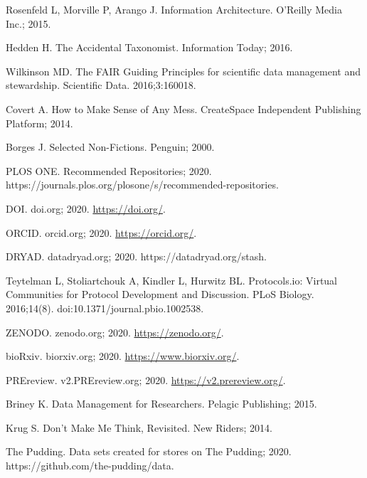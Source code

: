 \documentclass[10pt,letterpaper]{article}
\begin{document}
% 
\begin{thebibliography}{10}

Rosenfeld L, Morville P, Arango J.
\newblock Information Architecture.
\newblock O'Reilly Media Inc.; 2015.

Hedden H.
\newblock The Accidental Taxonomist.
\newblock Information Today; 2016.

Wilkinson MD.
\newblock The FAIR Guiding Principles for scientific data management and
  stewardship.
\newblock Scientific Data. 2016;3:160018.

Covert A.
\newblock How to Make Sense of Any Mess.
\newblock CreateSpace Independent Publishing Platform; 2014.

Borges J.
\newblock Selected Non-Fictions.
\newblock Penguin; 2000.

{PLOS ONE}. Recommended Repositories; 2020.
\newblock https://journals.plos.org/plosone/s/recommended-repositories.

DOI. doi.org; 2020.
\newblock \url{https://doi.org/}.

ORCID. orcid.org; 2020.
\newblock \url{https://orcid.org/}.

{DRYAD}. datadryad.org; 2020.
\newblock https://datadryad.org/stash.

Teytelman L, Stoliartchouk A, Kindler L, Hurwitz BL.
\newblock Protocols.io: Virtual Communities for Protocol Development and
  Discussion.
\newblock PLoS Biology. 2016;14(8).
\newblock doi:{10.1371/journal.pbio.1002538}.

ZENODO. zenodo.org; 2020.
\newblock \url{https://zenodo.org/}.

{bioRxiv}. biorxiv.org; 2020.
\newblock \url{https://www.biorxiv.org/}.

{PREreview}. v2.PREreview.org; 2020.
\newblock \url{https://v2.prereview.org/}.

Briney K.
\newblock Data Management for Researchers.
\newblock Pelagic Publishing; 2015.

Krug S.
\newblock Don't Make Me Think, Revisited.
\newblock New Riders; 2014.

{The Pudding}. Data sets created for stores on {The Pudding}; 2020.
\newblock https://github.com/the-pudding/data.


\end{thebibliography}
\end{document}
